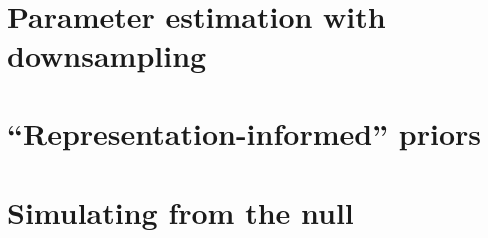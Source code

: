 \documentclass[a4paper,10pt]{article}
\begin{document}
 \begin{figure}[h]
\begin{center}
\\
\end{center}
\caption{}
\label{fig:only2000sky}
\end{figure}

\section{Parameter estimation with downsampling}
\section{``Representation-informed'' priors}
\section{Simulating from the null}
\end{document}
